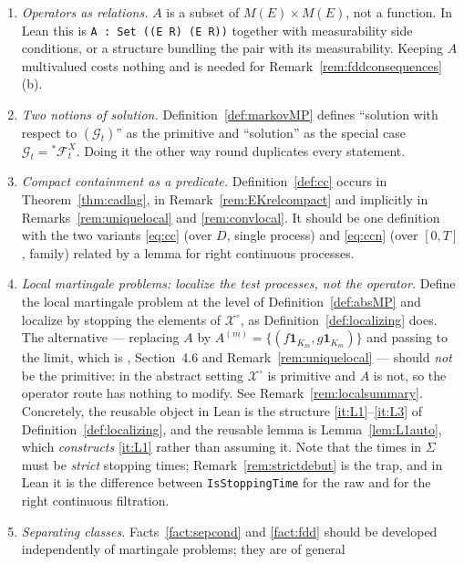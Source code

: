 \documentclass[11pt,a4paper]{article}
\theoremstyle{plain}
\theoremstyle{definition}
\theoremstyle{remark}
\newcommand{\Meas}{M}                          %
\newcommand{\Filt}{\mathcal{F}}
\newcommand{\Gilt}{\mathcal{G}}
\newcommand{\XX}{\mathcal{X}}                  %
\newcommand{\one}{\mathbf{1}}
\newcommand{\EK}{\cite{EK86}}
\begin{document}
\begin{enumerate}[label=(\alph*)]
\item \emph{Operators as relations.}  $A$ is a subset of
  $\Meas(E) \times \Meas(E)$, not a function.  In Lean this is
  \texttt{A : Set ((E \textrightarrow{} R) \texttimes{} (E \textrightarrow{} R))} together with measurability side
  conditions, or a structure bundling the pair with its measurability.  Keeping
  $A$ multivalued costs nothing and is needed for
  Remark~\ref{rem:fddconsequences}(b).
\item \emph{Two notions of solution.}  Definition~\ref{def:markovMP} defines
  ``solution with respect to $(\Gilt_t)$'' as the primitive and ``solution''
  as the special case $\Gilt_t = {}^{*}\Filt^X_t$.  Doing it the other way round
  duplicates every statement.
\item \emph{Compact containment as a predicate.}  Definition~\ref{def:cc} occurs
  in Theorem~\ref{thm:cadlag}, in Remark~\ref{rem:EKrelcompact} and implicitly in
  Remarks~\ref{rem:uniquelocal} and \ref{rem:convlocal}.  It should be one
  definition with the two variants \eqref{eq:cc} (over $D$, single process) and
  \eqref{eq:ccn} (over $[0,T]$, family) related by a lemma for right continuous
  processes.
\item \emph{Local martingale problems: localize the test processes, not the
  operator.}  Define the local martingale problem at the level of
  Definition~\ref{def:absMP} and localize by stopping the elements of $\XX^\circ$,
  as Definition~\ref{def:localizing} does.  The alternative --- replacing $A$ by
  $A^{(m)} = \{(f\one_{K_m}, g\one_{K_m})\}$ and passing to the limit, which is
  \EK, Section~4.6 and Remark~\ref{rem:uniquelocal} --- should \emph{not} be the
  primitive: in the abstract setting $\XX^\circ$ is primitive and $A$ is not, so
  the operator route has nothing to modify.  See Remark~\ref{rem:localsummary}.
  Concretely, the reusable object in Lean is the structure
  \ref{it:L1}--\ref{it:L3} of Definition~\ref{def:localizing}, and the reusable
  lemma is Lemma~\ref{lem:L1auto}, which \emph{constructs} \ref{it:L1} rather than
  assuming it.  Note that the times in $\Sigma$ must be \emph{strict} stopping
  times; Remark~\ref{rem:strictdebut} is the trap, and in Lean it is the
  difference between \texttt{IsStoppingTime} for the raw and for the right
  continuous filtration.
\item \emph{Separating classes.}  Facts~\ref{fact:sepcond} and \ref{fact:fdd}
  should be developed independently of martingale problems; they are of general

\end{enumerate}
\end{document}
